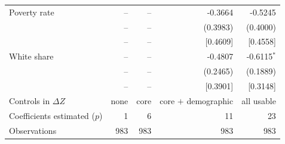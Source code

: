 \begin{tabular}{lrrrr}
Poverty rate & -- & -- & -0.3664 & -0.5245 \\
 & -- & -- & (0.3983) & (0.4000) \\
 & -- & -- & [0.4609] & [0.4558] \\
White share & -- & -- & -0.4807 & -0.6115$^{*}$ \\
 & -- & -- & (0.2465) & (0.1889) \\
 & -- & -- & [0.3901] & [0.3148] \\
\midrule
Controls in $\Delta Z$ & none & core & core $+$ demographic & all usable \\
Coefficients estimated ($p$) & 1 & 6 & 11 & 23 \\
Observations & 983 & 983 & 983 & 983 \\
\bottomrule
\end{tabular}
